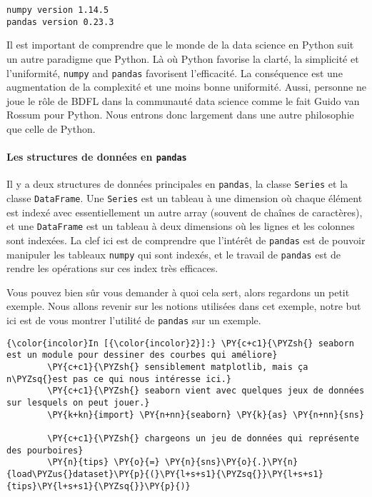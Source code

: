     \begin{Verbatim}[commandchars=\\\{\},frame=single,framerule=0.3mm,rulecolor=\color{cellframecolor}]
numpy version 1.14.5
pandas version 0.23.3
\end{Verbatim}

    Il est important de comprendre que le monde de la data science en Python
suit un autre paradigme que Python. Là où Python favorise la clarté, la
simplicité et l'uniformité, \texttt{numpy} and \texttt{pandas}
favorisent l'efficacité. La conséquence est une augmentation de la
complexité et une moins bonne uniformité. Aussi, personne ne joue le
rôle de BDFL dans la communauté data science comme le fait Guido van
Rossum pour Python. Nous entrons donc largement dans une autre
philosophie que celle de Python.

    \hypertarget{les-structures-de-donnuxe9es-en-pandas}{%
\paragraph{\texorpdfstring{Les structures de données en
\texttt{pandas}}{Les structures de données en pandas}}\label{les-structures-de-donnuxe9es-en-pandas}}

    Il y a deux structures de données principales en \texttt{pandas}, la
classe \texttt{Series} et la classe \texttt{DataFrame}. Une
\texttt{Series} est un tableau à une dimension où chaque élément est
indexé avec essentiellement un autre array (souvent de chaînes de
caractères), et une \texttt{DataFrame} est un tableau à deux dimensions
où les lignes et les colonnes sont indexées. La clef ici est de
comprendre que l'intérêt de \texttt{pandas} est de pouvoir manipuler les
tableaux \texttt{numpy} qui sont indexés, et le travail de
\texttt{pandas} est de rendre les opérations sur ces index très
efficaces.

    Vous pouvez bien sûr vous demander à quoi cela sert, alors regardons un
petit exemple. Nous allons revenir sur les notions utilisées dans cet
exemple, notre but ici est de vous montrer l'utilité de \texttt{pandas}
sur un exemple.

    \begin{Verbatim}[commandchars=\\\{\},frame=single,framerule=0.3mm,rulecolor=\color{cellframecolor}]
{\color{incolor}In [{\color{incolor}2}]:} \PY{c+c1}{\PYZsh{} seaborn est un module pour dessiner des courbes qui améliore}
        \PY{c+c1}{\PYZsh{} sensiblement matplotlib, mais ça n\PYZsq{}est pas ce qui nous intéresse ici.}
        \PY{c+c1}{\PYZsh{} seaborn vient avec quelques jeux de données sur lesquels on peut jouer.}
        \PY{k+kn}{import} \PY{n+nn}{seaborn} \PY{k}{as} \PY{n+nn}{sns}
        
        \PY{c+c1}{\PYZsh{} chargeons un jeu de données qui représente des pourboires}
        \PY{n}{tips} \PY{o}{=} \PY{n}{sns}\PY{o}{.}\PY{n}{load\PYZus{}dataset}\PY{p}{(}\PY{l+s+s1}{\PYZsq{}}\PY{l+s+s1}{tips}\PY{l+s+s1}{\PYZsq{}}\PY{p}{)}
\end{Verbatim}



